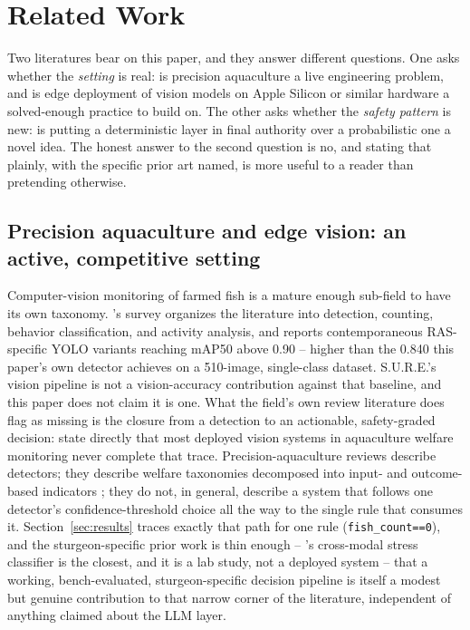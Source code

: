 \section{Related Work}
\label{sec:related-work}

Two literatures bear on this paper, and they answer different questions. One asks whether the
\emph{setting} is real: is precision aquaculture a live engineering problem, and is edge
deployment of vision models on Apple Silicon or similar hardware a solved-enough practice to build
on. The other asks whether the \emph{safety pattern} is new: is putting a deterministic layer in
final authority over a probabilistic one a novel idea. The honest answer to the second question is
no, and stating that plainly, with the specific prior art named, is more useful to a reader than
pretending otherwise.

\subsection{Precision aquaculture and edge vision: an active, competitive setting}

Computer-vision monitoring of farmed fish is a mature enough sub-field to have its own taxonomy.
\citet{cui2025fishtracking}'s survey organizes the literature into detection, counting, behavior
classification, and activity analysis, and reports contemporaneous RAS-specific YOLO variants
reaching mAP50 above 0.90 -- higher than the 0.840 this paper's own detector achieves on a
510-image, single-class dataset. S.U.R.E.'s vision pipeline is not a vision-accuracy contribution
against that baseline, and this paper does not claim it is one. What the field's own review
literature does flag as missing is the closure from a detection to an actionable, safety-graded
decision: \citet{fitzgerald2025machinevision} state directly that most deployed vision systems in
aquaculture welfare monitoring never complete that trace. Precision-aquaculture reviews describe
detectors; they describe welfare taxonomies decomposed into input- and outcome-based indicators
\citep{frontiers2023welfare,pmc2021myfishcheck}; they do not, in general, describe a system that
follows one detector's confidence-threshold choice all the way to the single rule that consumes it.
Section~\ref{sec:results} traces exactly that path for one rule (\texttt{fish\_count==0}), and the
sturgeon-specific prior work is thin enough -- \citet{sturgeon2024cmscn}'s cross-modal stress
classifier is the closest, and it is a lab study, not a deployed system -- that a working,
bench-evaluated, sturgeon-specific decision pipeline is itself a modest but genuine contribution to that
narrow corner of the literature, independent of anything claimed about the LLM layer.

